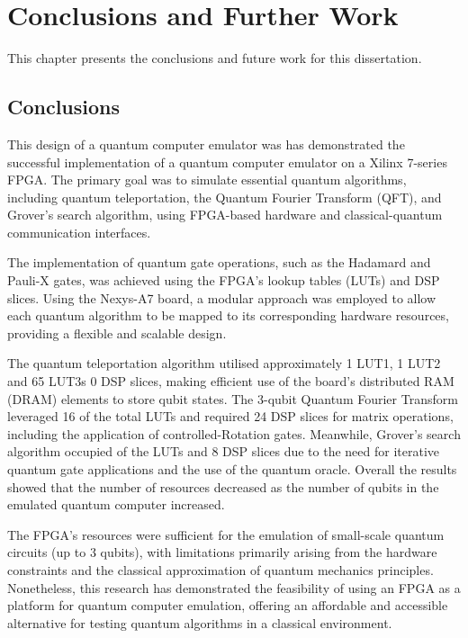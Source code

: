 \chapter{\label{ch:conclusions} Conclusions and Further Work}

This chapter presents the conclusions and future work for this dissertation.

\section{Conclusions}

This design of a quantum computer emulator was has demonstrated the successful implementation of a quantum computer emulator on a Xilinx 7-series FPGA. The primary goal was to simulate essential quantum algorithms, including quantum teleportation, the Quantum Fourier Transform (QFT), and Grover's search algorithm, using FPGA-based hardware and classical-quantum communication interfaces.

The implementation of quantum gate operations, such as the Hadamard and Pauli-X gates, was achieved using the FPGA's lookup tables (LUTs) and DSP slices. Using the Nexys-A7 board, a modular approach was employed to allow each quantum algorithm to be mapped to its corresponding hardware resources, providing a flexible and scalable design.

The quantum teleportation algorithm utilised approximately 1 LUT1, 1 LUT2 and 65 LUT3s 0 DSP slices, making efficient use of the board's distributed RAM (DRAM) elements to store qubit states. The 3-qubit Quantum Fourier Transform leveraged 16 of the total LUTs and required 24 DSP slices for matrix operations, including the application of controlled-Rotation gates. Meanwhile, Grover's search algorithm occupied  of the LUTs and 8 DSP slices due to the need for iterative quantum gate applications and the use of the quantum oracle. Overall the results showed that the number of resources decreased as the number of qubits in the emulated quantum computer increased.

The FPGA’s resources were sufficient for the emulation of small-scale quantum circuits (up to 3 qubits), with limitations primarily arising from the hardware constraints and the classical approximation of quantum mechanics principles. Nonetheless, this research has demonstrated the feasibility of using an FPGA as a platform for quantum computer emulation, offering an affordable and accessible alternative for testing quantum algorithms in a classical environment.

